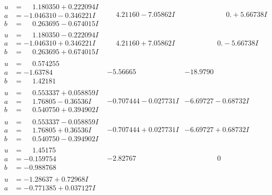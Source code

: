 \documentclass[1p]{elsarticle_modified}
\theoremstyle{definition}
\begin{document}
$$\begin{array}{c|c|c}
\begin{aligned}
u &= \phantom{-}1.180350 + 0.222094 I \\
a &= -1.046310 - 0.346221 I \\
b &= \phantom{-}0.263695 - 0.674015 I\end{aligned}
 & \phantom{-}4.21160 - 7.05862 I & \phantom{-0.000000 -}0. + 5.66738 I \\ \hline\begin{aligned}
u &= \phantom{-}1.180350 - 0.222094 I \\
a &= -1.046310 + 0.346221 I \\
b &= \phantom{-}0.263695 + 0.674015 I\end{aligned}
 & \phantom{-}4.21160 + 7.05862 I & \phantom{-0.000000 } 0. - 5.66738 I \\ \hline\begin{aligned}
u &= \phantom{-}0.574255\phantom{ +0.000000I} \\
a &= -1.63784\phantom{ +0.000000I} \\
b &= \phantom{-}1.42181\phantom{ +0.000000I}\end{aligned}
 & -5.56665\phantom{ +0.000000I} & -18.9790\phantom{ +0.000000I} \\ \hline\begin{aligned}
u &= \phantom{-}0.553337 + 0.058859 I \\
a &= \phantom{-}1.76805 - 0.36536 I \\
b &= \phantom{-}0.540750 + 0.394902 I\end{aligned}
 & -0.707444 - 0.027731 I & -6.69727 - 0.68732 I \\ \hline\begin{aligned}
u &= \phantom{-}0.553337 - 0.058859 I \\
a &= \phantom{-}1.76805 + 0.36536 I \\
b &= \phantom{-}0.540750 - 0.394902 I\end{aligned}
 & -0.707444 + 0.027731 I & -6.69727 + 0.68732 I \\ \hline\begin{aligned}
u &= \phantom{-}1.45175\phantom{ +0.000000I} \\
a &= -0.159754\phantom{ +0.000000I} \\
b &= -0.988768\phantom{ +0.000000I}\end{aligned}
 & -2.82767\phantom{ +0.000000I} & \phantom{-0.000000 } 0 \\ \hline\begin{aligned}
u &= -1.28637 + 0.72968 I \\
a &= -0.771385 + 0.037127 I \\

\end{aligned}
\end{array}$$
\end{document}
